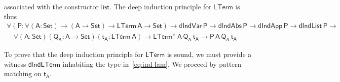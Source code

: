 \documentclass[9pt]{entcs}
\begin{document}
associated with the constructor $\mathsf{list}$. The deep induction
principle for $\mathsf{LTerm}$ is thus
\begin{equation}\label{eq:ind-lam}
\begin{array}{l}
\mathsf{\forall (P : \forall (A : Set) \to (A \to Set) \to LTerm\,A
  \to Set) \to dIndVar\,P \to dIndAbs\,P \to dIndApp\,P \to
  dIndList\,P \to} \\ \quad \mathsf{\forall (A : Set)(Q_A : A \to
  Set)(t_A : LTerm\,A) \to LTerm^{\wedge}\,A\,Q_A\,t_A \to
  P\,A\,Q_A\,t_A}
\end{array}
\end{equation}

To prove that the deep induction principle for $\mathsf{LTerm}$ is
sound, we must provide a witness $\mathsf{dIndLTerm}$ inhabiting the
type in~\eqref{eq:ind-lam}. We proceed by pattern matching on
$\mathsf{t_A}$.
\end{document}
